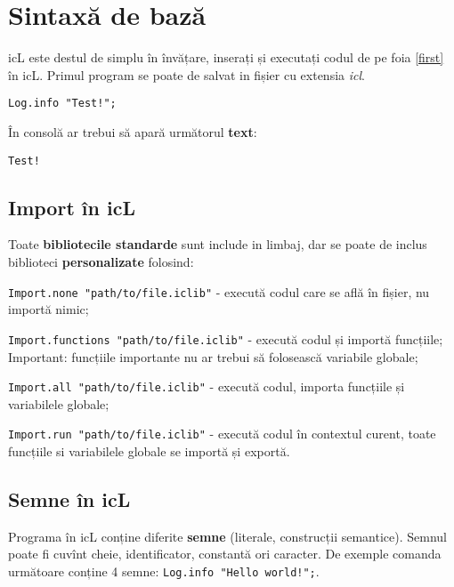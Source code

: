 \section{Sintaxă de bază}

icL este destul de simplu în învățare, inserați și executați codul de pe foia \ref{first} în icL. Primul program se poate de salvat in fișier cu extensia \textit{icl}.

\begin{lstlisting}[caption=Prima programă, label=first]
Log.info "Test!";
\end{lstlisting}

În consolă ar trebui să apară următorul \textbf{text}:

\begin{lstlisting}[numbers=none]
Test!
\end{lstlisting}

\subsection{Import în icL}

Toate \textbf{bibliotecile standarde} sunt include in limbaj, dar se poate de inclus biblioteci \textbf{personalizate} folosind:

\begin{icItems}
\item
	\lstinline|Import.none "path/to/file.iclib"| - execută codul care se află în fișier, nu importă nimic;
\item
	\lstinline|Import.functions "path/to/file.iclib"| - execută codul și importă funcțiile; {\color{red}Important:} funcțiile importante nu ar trebui să folosească variabile globale;
\item
	\lstinline|Import.all "path/to/file.iclib"| -  execută codul, importa funcțiile și variabilele globale;
\item
	\lstinline|Import.run "path/to/file.iclib"| - execută codul în contextul curent, toate funcțiile si variabilele globale se importă și exportă.
\end{icItems}

\subsection{Semne în icL}

Programa în icL conține diferite \textbf{semne} (literale, construcții semantice). Semnul poate fi cuvînt cheie, identificator, constantă ori caracter. De exemple comanda următoare conține 4 semne: \lstinline|Log.info "Hello world!";|.

